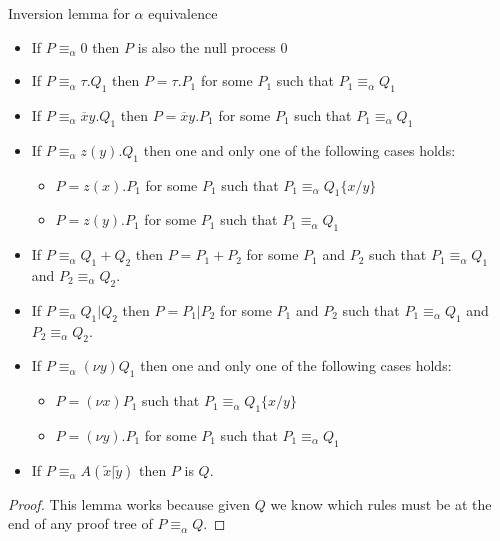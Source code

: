 \begin{lemma}
  Inversion lemma for $\alpha$ equivalence
  \begin{itemize}
    \item 	
      If $P\equiv_{\alpha}0$ then $P$ is also the null process $0$
    \item
      If $P\equiv_{\alpha} \tau.Q_{1}$ then $P=\tau.P_{1}$ for some $P_{1}$ such that $P_{1}\equiv_{\alpha}Q_{1}$
    \item
      If $P\equiv_{\alpha} \overline{x}y.Q_{1}$ then $P=\overline{x}y.P_{1}$ for some $P_{1}$ such that $P_{1}\equiv_{\alpha}Q_{1}$
    \item
      If $P\equiv_{\alpha} z(y).Q_{1}$ then one and only one of the following cases holds:
      \begin{itemize}
	\item 
	  $P=z(x).P_{1}$ for some $P_{1}$ such that $P_{1}\equiv_{\alpha}Q_{1}\{x/y\}$
	\item
	  $P=z(y).P_{1}$ for some $P_{1}$ such that $P_{1}\equiv_{\alpha}Q_{1}$
      \end{itemize}
    \item
      If $P\equiv_{\alpha} Q_{1}+Q_{2}$ then $P=P_{1}+P_{2}$ for some $P_{1}$ and $P_{2}$ such that $P_{1}\equiv_{\alpha}Q_{1}$ and $P_{2}\equiv_{\alpha}Q_{2}$.
    \item 
      If $P\equiv_{\alpha} Q_{1}|Q_{2}$ then $P=P_{1}|P_{2}$ for some $P_{1}$ and $P_{2}$ such that $P_{1}\equiv_{\alpha}Q_{1}$ and $P_{2}\equiv_{\alpha}Q_{2}$.
    \item 
      If $P\equiv_{\alpha} (\nu y)Q_{1}$ then one and only one of the following cases holds:
      \begin{itemize}
	\item
	  $P=(\nu x)P_{1}$ such that $P_{1}\equiv_{\alpha}Q_{1}\{x/y\}$
	\item
	  $P=(\nu y).P_{1}$ for some $P_{1}$ such that $P_{1}\equiv_{\alpha}Q_{1}$
      \end{itemize}
    \item 
      If $P\equiv_{\alpha} A(\tilde{x}|\tilde{y})$ then $P$ is $Q$.
  \end{itemize}
    \begin{proof}
      This lemma works because given $Q$ we know which rules must be at the end of any proof tree of $P\equiv_{\alpha}Q$.
    \end{proof}
\end{lemma}




